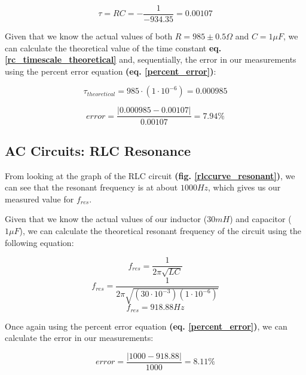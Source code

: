 \documentclass{article}
\begin{document}
\begin{equation}
    \label{rc_timescale_measured}
    \tau=RC=-\frac{1}{-934.35}=0.00107
\end{equation}

Given that we know the actual values of both $R=985\pm0.5\Omega$ and $C=1\mu F$, we
can calculate the theoretical value of the time constant \textbf{eq.
\ref{rc_timescale_theoretical}} and, sequentially, the error in our measurements
using the percent error equation \textbf{(eq. \ref{percent_error})}:

\begin{equation}
    \label{rc_timescale_theoretical}
    \tau_{theoretical}=985\cdot(1\cdot10^{-6})=0.000985
\end{equation}

\begin{equation}
    \label{rc_err_analysis}
    error=\frac{|0.000985-0.00107|}{0.00107}=7.94\%
\end{equation}

\subsection{AC Circuits: RLC Resonance}

From looking at the graph of the RLC circuit \textbf{(fig.
\ref{rlccurve_resonant})}, we can see that the resonant frequency is at about
$1000 Hz$, which gives us our measured value for $f_{res}$.

Given that we know the actual values of our inductor ($30mH$) and capacitor
($1\mu F$), we can
calculate the theoretical resonant frequency of the circuit using the following
equation:

\begin{equation}
    \label{resonant_frequency_1}
    f_{res}=\frac{1}{2\pi\sqrt{LC}}
\end{equation}
\begin{equation}
    \label{resonant_frequency_2}
    f_{res}=\frac{1}{2\pi\sqrt{(30\cdot10^{-3})(1\cdot10^{-6})}}
\end{equation}
\begin{equation}
    \label{resonant_frequency_3}
    f_{res}=918.88Hz
\end{equation}

Once again using the percent error equation \textbf{(eq. \ref{percent_error})}, we
can calculate the error in our measurements:

\begin{equation}
    \label{resonance_err_analysis}
    error=\frac{|1000-918.88|}{1000}=8.11\% \end{equation}
\end{document}
